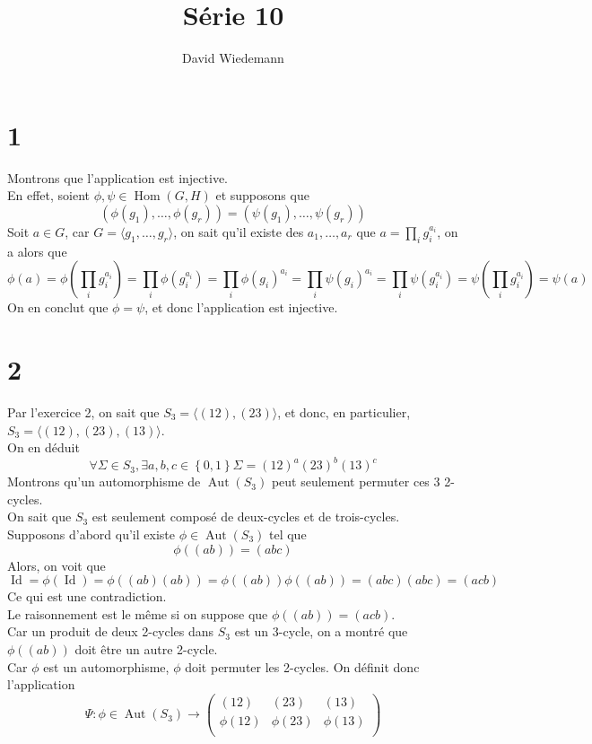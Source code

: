 \documentclass[11pt, a4paper]{article}
\DeclareMathOperator*{\om}{Hom}
\DeclareMathOperator*{\aut}{Aut}
\DeclareMathOperator*{\id}{Id}
\begin{document}
\title{Série 10}
\author{David Wiedemann}
\maketitle
\section*{1}
Montrons que l'application est injective.\\
En effet, soient $\phi, \psi \in \om(G,H ) $ et supposons que
\[ 
	( \phi( g_1) , \ldots, \phi( g_r) ) = ( \psi( g_1) , \ldots, \psi( g_r) )
\]
Soit $a \in G$, car $G= \langle g_1, \ldots, g_r \rangle$, on sait qu'il existe des $a_1, \ldots, a_r$ que $a= \prod_i g_i^{a_i}$, on a alors que
\[ 
	\phi( a) = \phi\left( \prod_i g_i ^{a_i}\right) = \prod_i \phi( g_i ^{a_i} )  = \prod_i \phi( g_i) ^{a_i} = \prod_i \psi( g_i) ^{a_i}= \prod_i \psi\left( g_i^{a_i}\right) = \psi\left( \prod_i g_i ^{a_i}\right) = \psi( a) 
\]
On en conclut que $\phi= \psi$, et donc l'application est injective.
\section*{2}
Par l'exercice 2, on sait que $S_3 = \langle ( 12) , ( 23) \rangle$, et donc, en particulier, $S_3 = \langle ( 12) , ( 23), ( 13)\rangle $.\\
On en déduit
\[ 
	\forall \Sigma \in S_3, \exists a,b,c \in  \left\{ 0,1 \right\}  \Sigma = ( 12) ^{a} ( 23) ^{b} ( 13) ^{c}
\]
Montrons qu'un automorphisme de $\aut( S_3) $ peut seulement permuter ces 3 2-cycles.\\
On sait que $S_3$ est seulement composé de deux-cycles et de trois-cycles.\\
Supposons d'abord qu'il existe $\phi \in \aut( S_3) $ tel que
\[ 
	\phi( ( ab) ) = ( abc) 
\]
Alors, on voit que
\[ 
	\id = \phi( \id) = \phi( ( ab) ( ab) ) = \phi( ( ab) ) \phi( ( ab )) = ( abc) ( abc) = ( acb) 
\]
Ce qui est une contradiction.\\
Le raisonnement est le même si on suppose que $\phi( ( ab) ) = ( acb) $.\\
Car un produit de deux 2-cycles dans $S_3$ est un 3-cycle, on a montré que $\phi( ( ab )) $ doit être un autre 2-cycle.\\
Car $\phi$ est un automorphisme, $\phi$ doit permuter les 2-cycles.
On définit donc l'application
\[ 
	\Psi: \phi\in \aut( S_3) \to 
	\begin{pmatrix}
		( 12) & ( 23) & ( 13) \\
		\phi( 12) & \phi( 23) & \phi( 13) \\
	\end{pmatrix}
\]
\end{document}

